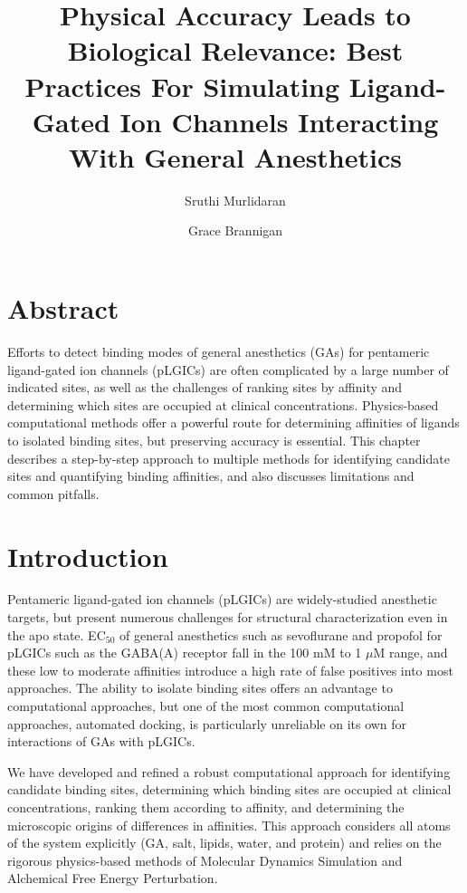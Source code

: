 \documentclass[12pt]{article}
\title{{Physical Accuracy Leads to Biological Relevance: Best Practices For Simulating Ligand-Gated Ion Channels Interacting With General Anesthetics} }
\author[a,1]{Sruthi Murlidaran}
\author[a,b,2]{Grace Brannigan}
\affil[a]{Rutgers University, Center for Computational and Integrative Biology, Rutgers University, Camden, NJ, USA}
\affil[b]{Department of Physics, Rutgers University, Camden, NJ, USA}
\begin{document}
\maketitle

\section*{Abstract}
Efforts to detect binding modes of general anesthetics (GAs) for pentameric ligand-gated ion channels (pLGICs) are often complicated by a large number of indicated sites, as well as the challenges of ranking sites by affinity and determining which sites are occupied at clinical concentrations.  Physics-based computational methods offer a powerful route for determining affinities of ligands to isolated binding sites, but preserving accuracy is essential.  This chapter describes a step-by-step approach to multiple methods for identifying candidate sites and quantifying binding affinities, and also discusses limitations and common pitfalls.

\section{Introduction}

Pentameric ligand-gated ion channels (pLGICs) are widely-studied anesthetic targets, but present numerous challenges for structural characterization even in the apo state.  EC$_{50}$ of general anesthetics such as sevoflurane and propofol for pLGICs such as the GABA(A) receptor fall in the 100 mM to 1 $\mu$M range, and these low to moderate affinities introduce a high rate of false positives into most approaches.  The ability to isolate binding sites offers an advantage to computational approaches, but one of the most common computational approaches, automated docking, is particularly unreliable on its own for interactions of GAs with pLGICs.  

We have developed and refined a robust computational approach for identifying candidate binding sites, determining which binding sites are occupied at clinical concentrations, ranking them according to affinity, and determining the microscopic origins of differences in affinities. This approach considers all atoms of the system explicitly (GA, salt, lipids, water, and protein) and relies on the rigorous physics-based methods of Molecular Dynamics Simulation and Alchemical Free Energy Perturbation. 
\end{document}
